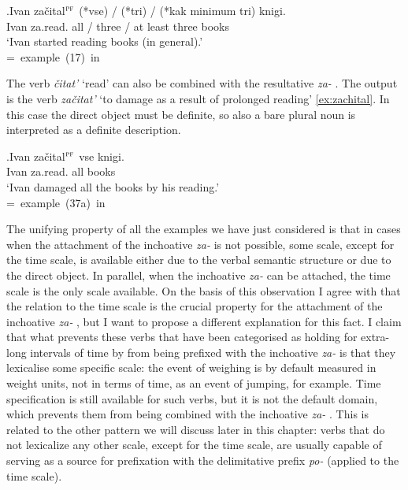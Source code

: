 \exg.Ivan za\v{c}ital$^{\textsc{pf}}$ (*vse) / (*tri) / (*kak minimum tri) knigi.\\
Ivan za.read. all / three / at least three books\\
\trans `Ivan started reading books (in general).'\\\hbox{}\hfill\hbox{= example (17) in \citealt[227]{Braginsky:08}}

The verb \textit{\v{c}itat'} `read' can also be combined with the resultative  \textit{za-}  . The output is the verb \textit{za\v{c}itat'} `to damage as a result of prolonged reading' \ref{ex:zachital}. In this case the direct object must be definite, so also a bare plural noun is interpreted as a definite description.

\exg.\label{ex:zachital}Ivan za\v{c}ital$^{\textsc{pf}}$ vse knigi.\\
Ivan za.read. all books\\
`Ivan damaged all the books by his reading.'\\\hbox{}\hfill\hbox{= example (37a) in \citealt[246]{Braginsky:08}}

The unifying property of all the examples we have just considered is that in cases when the attachment of the inchoative  \textit{za-}   is not possible, some scale, except for the time scale, is available either due to the verbal semantic structure or due to the direct object. In parallel, when the inchoative  \textit{za-}   can be attached, the time scale is the only scale available. On the basis of this observation I agree with \citet{Paducheva:96} that the relation to the time scale is the crucial property for the attachment of the inchoative  \textit{za-}  , but I want to propose a different explanation for this fact. I claim that what prevents these verbs that have been categorised as holding for extra-long intervals of time by \citet{Paducheva:96} from being prefixed with the inchoative  \textit{za-}   is that they lexicalise some specific scale: the event of weighing is by default measured in weight units, not in terms of time, as an event of jumping, for example. Time specification is still available for such verbs, but it is not the default domain, which prevents them from being combined with the inchoative  \textit{za-}  . This is related to the other pattern we will discuss later in this chapter: verbs that do not lexicalize any other scale, except for the time scale, are usually capable of serving as a source for prefixation  with the delimitative  prefix \textit{po-}   (applied to the time scale). 

